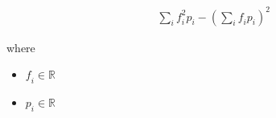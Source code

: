\documentclass[12pt]{article}
\begin{document}
\begin{align*}
 & \sum_\textit{i} \textit{f}_{ \textit{i} }^{2}\textit{p}_{ \textit{i} } - \left( \sum_\textit{i} \textit{f}_{ \textit{i} }\textit{p}_{ \textit{i} } \right)^{2}
\end{align*}

where
\begin{itemize}
\item $\textit{f}_{\textit{i}} \in \mathbb{{R}}$
\item $\textit{p}_{\textit{i}} \in \mathbb{{R}}$
\end{itemize}
\end{document}
